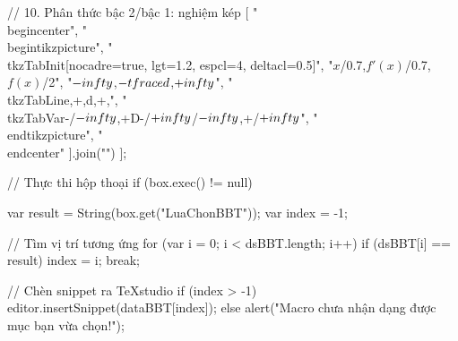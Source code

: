// 10. Phân thức bậc 2/bậc 1: nghiệm kép
[
"\\begin{center}",
"\\begin{tikzpicture}",
"\\tkzTabInit[nocadre=true, lgt=1.2, espcl=4, deltacl=0.5]",
"{$x$/0.7,$f'(x)$/0.7,$f(x)$/2}",
"{$-\\infty$,$-\\tfrac{e}{d}$,$+\\infty$}",
"\\tkzTabLine{,+,d,+,}",
"\\tkzTabVar{-/$-\\infty$,+D-/$+\\infty$/$-\\infty$,+/$+\\infty$}",
"\\end{tikzpicture}",
"\\end{center}"
].join("\n")
];

// Thực thi hộp thoại
if (box.exec() != null) {
	var result = String(box.get("LuaChonBBT"));
	var index = -1;
	
	// Tìm vị trí tương ứng
	for (var i = 0; i < dsBBT.length; i++) {
		if (dsBBT[i] == result) {
			index = i;
			break;
		}
	}
	
	// Chèn snippet ra TeXstudio
	if (index > -1) {
		editor.insertSnippet(dataBBT[index]);
	} else {
		alert("Macro chưa nhận dạng được mục bạn vừa chọn!");
	}
}